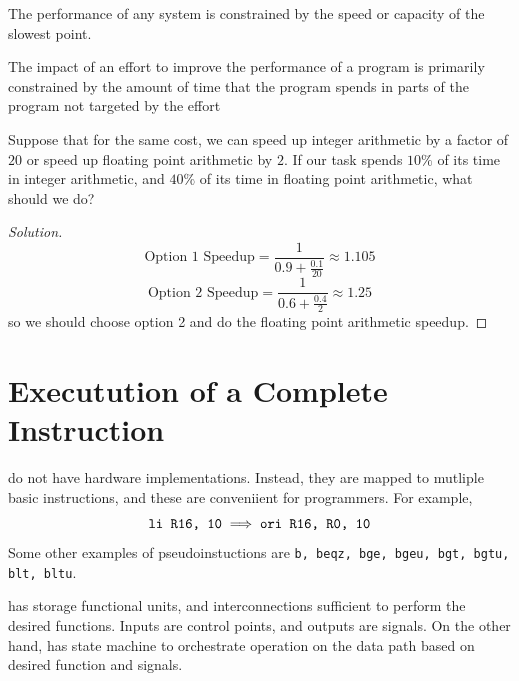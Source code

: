 \documentclass[12pt]{scrartcl}
\begin{document}
\begin{note}
  The performance of any system is constrained by the speed or capacity of the slowest point. 
\end{note}

\begin{note}
  The impact of an effort to improve the performance of a program is primarily constrained by the amount of time that the program spends in parts of the program not targeted by the effort
\end{note}

\begin{example}
  Suppose that for the same cost, we can speed up integer arithmetic by a factor of $20$ or speed 
  up floating point arithmetic by $2$. If our task spends $10\%$ of its time in 
  integer arithmetic, and $40\%$ of its time in floating point arithmetic, what should we do?

  \begin{proof}[Solution]
    \[\text{Option 1 Speedup} = \frac{1}{0.9 + \frac{0.1}{20}} \approx 1.105\]
    \[\text{Option 2 Speedup} = \frac{1}{0.6 + \frac{0.4}{2}} \approx 1.25\]
    so we should choose option 2 and do the floating point arithmetic speedup. 
  \end{proof}
\end{example}

\section{Executution of a Complete Instruction}

\begin{definition}[Pseudoinstructions]
   do not have hardware implementations. Instead, they are mapped to mutliple basic instructions, and  these are 
  conveniient for programmers. For example,
  \[\verb|li R16, 10| \implies \verb|ori R16, R0, 10|\]
  Some other examples of pseudoinstuctions are 
  \verb|b, beqz, bge, bgeu, bgt, bgtu, blt, bltu|.
\end{definition}

\begin{note}
   has storage functional units, and interconnections sufficient to perform the desired functions. 
  Inputs are control points, and outputs are signals. On the other hand,  has state machine to orchestrate operation on the 
  data path based on desired function and signals. 
\end{note}
\end{document}
